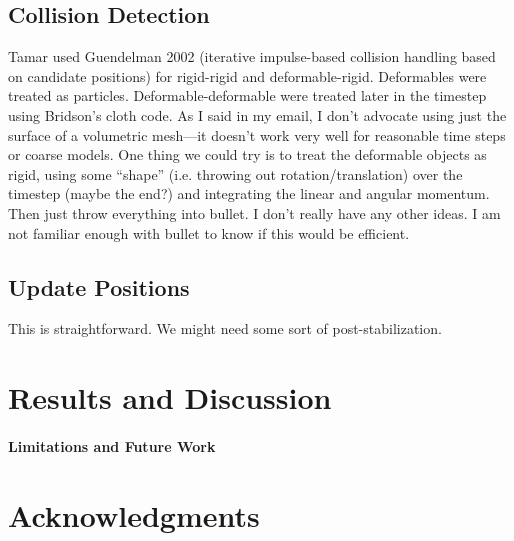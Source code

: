 \documentclass[review]{acmsiggraph-job}
\begin{document}
\subsection{Collision Detection}
Tamar used Guendelman 2002 (iterative impulse-based collision handling based on candidate positions) for rigid-rigid and deformable-rigid.
Deformables were treated as particles.  Deformable-deformable were treated later in the timestep using Bridson's cloth code.
As I said in my email, I don't advocate using just the surface of a volumetric mesh---it doesn't work very well for reasonable time steps or
coarse models.  One thing we could try is to treat the deformable objects as rigid, using some ``shape'' (i.e. throwing out rotation/translation)
over the timestep (maybe the end?) and integrating the linear and angular momentum.  Then just throw everything into bullet.  I don't really have
any other ideas.  I am not familiar enough with bullet to know if this would be efficient.

\subsection{Update Positions}
This is straightforward.  We might need some sort of post-stabilization.

\section{Results and Discussion}\label{sec:Results}

\paragraph{Limitations and Future Work}

\section*{Acknowledgments}




\end{document}
